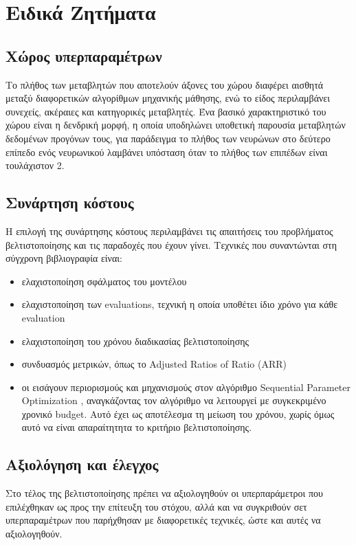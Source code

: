 \documentclass[]{article}
\numberwithin{equation}{section}		%
\numberwithin{figure}{section}			%
\numberwithin{table}{section}				%
\begin{document}
	\section{Ειδικά Ζητήματα}
	\subsection{Χώρος υπερπαραμέτρων}
	Το πλήθος των μεταβλητών που αποτελούν άξονες του χώρου διαφέρει αισθητά μεταξύ διαφορετικών αλγορίθμων μηχανικής μάθησης, ενώ το είδος περιλαμβάνει συνεχείς, ακέραιες και κατηγορικές μεταβλητές. Ένα βασικό χαρακτηριστικό του χώρου είναι η δενδρική μορφή, η οποία υποδηλώνει υποθετική παρουσία μεταβλητών δεδομένων προγόνων τους, για παράδειγμα το πλήθος των νευρώνων στο δεύτερο επίπεδο ενός νευρωνικού λαμβάνει υπόσταση όταν το πλήθος των επιπέδων είναι τουλάχιστον 2.
	\subsection{Συνάρτηση κόστους}
	Η επιλογή της συνάρτησης κόστους περιλαμβάνει τις απαιτήσεις του προβλήματος βελτιστοποίησης και τις παραδοχές που έχουν γίνει. Τεχνικές που συναντώνται στη σύγχρονη βιβλιογραφία είναι:
	\begin{itemize}
		\item ελαχιστοποίηση σφάλματος του μοντέλου 
		\item ελαχιστοποίηση των evaluations, τεχνική η οποία υποθέτει ίδιο χρόνο για κάθε evaluation
		\item ελαχιστοποίηση του χρόνου διαδικασίας βελτιστοποίησης
		\item συνδυασμός μετρικών, όπως το Adjusted Ratios of Ratio (ARR) \citep{Abdulrahman:2014:MCA:3015544.3015557}
		\item οι \citet{HutHooLeyMur10} εισάγουν περιορισμούς και μηχανισμούς στον αλγόριθμο Sequential Parameter Optimization \citep{1554761}, αναγκάζοντας τον αλγόριθμο να λειτουργεί με συγκεκριμένο χρονικό budget. Αυτό έχει ως αποτέλεσμα τη μείωση του χρόνου, χωρίς όμως αυτό να είναι απαραίτητητα το κριτήριο βελτιστοποίησης.
	\end{itemize}

	\subsection{Αξιολόγηση και έλεγχος}
	Στο τέλος της βελτιστοποίησης πρέπει να αξιολογηθούν οι υπερπαράμετροι που επιλέχθηκαν ως προς την επίτευξη του στόχου, αλλά και να συγκριθούν σετ υπερπαραμέτρων που παρήχθησαν με διαφορετικές τεχνικές, ώστε και αυτές να αξιολογηθούν.
\end{document}
